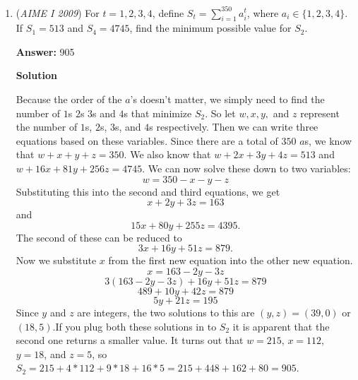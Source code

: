 \begin{enumerate}
\textbf{Solution 4 (BS Solution)}

Essentially you see that it must be an integer for infinite numbers, which doesn't quite seem probable. The most logical explanation is that the sequence repeats, and the numbers in the sequence that repeat are integers. We list out some terms.
 \begin{align*} a_{1} &= a \\ a_{2} &= b \\ a_{3} &=\frac{a+2009}{1+b} \\ a_{4} &=\frac{(b+1)(b+2009)}{a+b+2010} \\ \end{align*}
The terms get more and more wacky, so we just solve for $a,b$ such that $a_{1}=a_{3}$ and $a_{2}=a_{4}.$

 Solving we find both equations end up to the equation $ab=2009$ in which we see to minimize we see that $a = 49$ and $b=41$ or vice versa for an answer of $\boxed{90}.$ This solution is VERY non rigorous and not recommended.

 


	\item (\textit{AIME I 2009}) For $t = 1, 2, 3, 4$, define $S_t = \sum_{i = 1}^{350}a_i^t$, where $a_i \in \{1,2,3,4\}$. If $S_1 = 513$ and $S_4 = 4745$, find the minimum possible value for $S_2$.


 
 \textbf{Answer: }905



\textbf{Solution}

Because the order of the $a$'s doesn't matter, we simply need to find the number of $1$s $2$s $3$s and $4$s that minimize $S_2$. So let $w, x, y,$ and $z$ represent the number of $1$s, $2$s, $3$s, and $4$s respectively. Then we can write three equations based on these variables. Since there are a total of $350$ $a$s, we know that $w + x + y + z = 350$. We also know that $w + 2x + 3y + 4z = 513$ and $w + 16x + 81y + 256z = 4745$. We can now solve these down to two variables:
 \[w = 350 - x - y - z\]Substituting this into the second and third equations, we get
 \[x + 2y + 3z = 163\]and
 \[15x + 80y + 255z = 4395.\]The second of these can be reduced to 
 \[3x + 16y + 51z = 879.\]Now we substitute $x$ from the first new equation into the other new equation.
 \[x = 163 - 2y - 3z\]
 \[3(163 - 2y - 3z) + 16y + 51z = 879\]
 \[489 + 10y + 42z = 879\]
 \[5y + 21z = 195\]Since $y$ and $z$ are integers, the two solutions to this are $(y,z) = (39,0)$ or $(18,5)$.If you plug both these solutions in to $S_2$ it is apparent that the second one returns a smaller value. It turns out that $w = 215$, $x = 112$, $y = 18$, and $z = 5$, so $S_2 = 215 + 4*112 + 9*18 + 16*5 = 215 + 448 + 162 + 80 = \boxed{905}$.


\end{enumerate}
